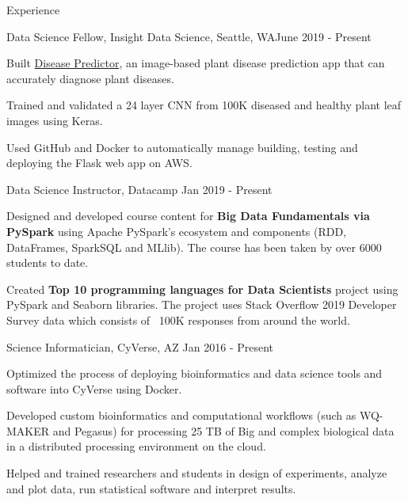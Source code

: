\documentclass{resume} %
\begin{document}
\begin{rSection}{Experience } \itemsep -1pt        

\begin{rSubsection}{Data Science Fellow, Insight Data Science, Seattle, WA}{June 2019 - Present}{}    

\vspace{-3pt}

\item Built \href{https://disease-predictor.onrender.com}{Disease Predictor}, an image-based plant disease prediction app that can accurately diagnose plant diseases.
\item Trained and validated a 24 layer CNN from 100K diseased and healthy plant leaf images using Keras.
\item Used GitHub and Docker to automatically manage building, testing and deploying the Flask web app on AWS.
\end{rSubsection} 

\vspace{-3pt}

\begin{rSubsection}{Data Science Instructor, Datacamp}
{Jan 2019 - Present}{}{}  %
\vspace{-3pt}
\item Designed and developed course content for \textbf{Big Data Fundamentals via PySpark} using Apache PySpark's ecosystem and components (RDD, DataFrames, SparkSQL and MLlib). The course has been taken by over 6000 students to date.
\item Created \textbf{Top 10 programming languages for Data Scientists} project using PySpark and Seaborn libraries. The project uses Stack Overflow 2019 Developer Survey data which consists of ~100K responses from around the world.
\vspace{-3pt}
\end{rSubsection}  

\begin{rSubsection}{Science Informatician, CyVerse, AZ }{Jan 2016 - Present}{}    

\vspace{-3pt}

\item Optimized the process of deploying bioinformatics and data science tools and software into CyVerse using Docker.
\item Developed custom bioinformatics and computational workflows (such as WQ-MAKER and Pegasus) for processing 25 TB of Big and complex biological data in a distributed processing environment on the cloud.
\item Helped and trained researchers and students in design of experiments, analyze and plot data, run statistical software and interpret results.
\end{rSubsection} 


\end{rSection}
\end{document}
